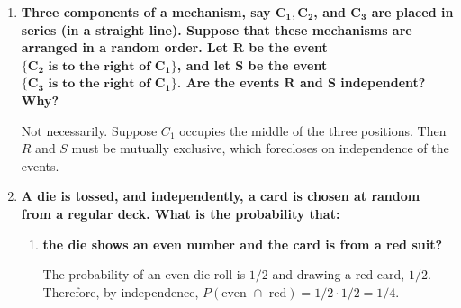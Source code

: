 \documentclass[10pt, oneside]{article}
\begin{document}
\begin{enumerate}[label=3.\arabic*]
\begin{enumerate}
	If $A$ and $B$ are mutually exclusive, then $P(A \cap B) = 0$. Therefore, $P(B) = P(A \cup B) - P(A) = \boxed{0.3}$.
	
	\item  \begin{tcolorbox}[
	  colback=Cerulean!5!white,
	  colframe=Cerulean!75!black]
	\textbf{For what choice of $\bm{p}$ are $\bm{A}$ and $\bm{B}$ independent?}
	\end{tcolorbox}
	
	If $A$ and $B$ are independent, then $P(A \cap B) = P(A) P(B) \implies P(A \cup B) = P(A) + P(B) - P(A) P(B)$. Then,
	
	\[ 0.7 = 0.4 + p - 0.4p \quad \implies \quad \boxed{p = 0.5} \]
	
	
	\end{enumerate}

\item  \begin{tcolorbox}[
  colback=Cerulean!5!white,
  colframe=Cerulean!75!black]
\textbf{Three components of a mechanism, say $\bm{C_1, C_2}$, and $\bm{C_3}$ are placed in series (in a straight line). Suppose that these mechanisms are arranged in a random order. Let $\bm{R}$ be the event $\bm{\{ C_2 \text{ is to the right of } C_1 \}}$, and let $\bm{S}$ be the event $\bm{\{ C_3 \text{ is to the right of } C_1 \}}$. Are the events $\bm{R}$ and $\bm{S}$ independent? Why?}
\end{tcolorbox}

Not necessarily. Suppose $C_1$ occupies the middle of the three positions. Then $R$ and $S$ must be mutually exclusive, which forecloses on independence of the events.

\item  \begin{tcolorbox}[
  colback=Cerulean!5!white,
  colframe=Cerulean!75!black]
\textbf{A die is tossed, and independently, a card is chosen at random from a regular deck. What is the probability that:}
\end{tcolorbox}

	\begin{enumerate}
	\item  \begin{tcolorbox}[
	  colback=Cerulean!5!white,
	  colframe=Cerulean!75!black]
	\textbf{the die shows an even number and the card is from a red suit?}
	\end{tcolorbox}
	
	The probability of an even die roll is $1/2$ and drawing a red card, $1/2$. Therefore, by independence, $P(\text{even } \cap \text{ red}) = 1/2 \cdot 1/2 = \boxed{1/4}$.
	

\end{enumerate}
\end{enumerate}
\end{document}
